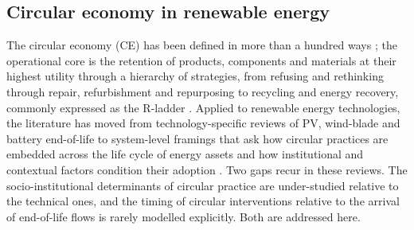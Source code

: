 \documentclass[a4paper,fleqn]{cas-sc}
\begin{document}
\subsection{Circular economy in renewable energy}
The circular economy (CE) has been defined in more than a hundred ways \citep{kirchherr2017}; the operational core is the retention of products, components and materials at their highest utility through a hierarchy of strategies, from refusing and rethinking through repair, refurbishment and repurposing to recycling and energy recovery, commonly expressed as the R-ladder \citep{potting2017,geissdoerfer2017}. Applied to renewable energy technologies, the literature has moved from technology-specific reviews of PV, wind-blade and battery end-of-life \citep{xu2018,chowdhury2020,farrell2020} to system-level framings that ask how circular practices are embedded across the life cycle of energy assets and how institutional and contextual factors condition their adoption \citep{ghasemi2026,hosseini2026,alqahtani2025}. Two gaps recur in these reviews. The socio-institutional determinants of circular practice are under-studied relative to the technical ones, and the timing of circular interventions relative to the arrival of end-of-life flows is rarely modelled explicitly. Both are addressed here.
\end{document}
